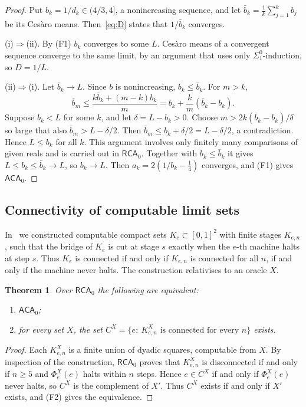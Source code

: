 \documentclass[11pt]{article}
\newtheorem{theorem}{Theorem}
\theoremstyle{definition}\newtheorem{definition}{Definition}[section]
\theoremstyle{remark}\newtheorem*{remark}{Remark}
\newcommand{\RCA}{\mathsf{RCA}_0}
\newcommand{\ACA}{\mathsf{ACA}_0}
\begin{document}
\begin{proof}
Put $b_k=1/d_k\in(4/3,4]$, a nonincreasing sequence, and let $\bar b_k=\tfrac1k\sum_{j=1}^kb_j$ be its Ces\`aro means. Then~\eqref{eq:D}
states that $1/\bar b_k$ converges.

(i)$\Rightarrow$(ii). By (F1) $b_k$ converges to some $L$. Ces\`aro means of a convergent sequence converge to the same limit,
by an argument that uses only $\Sigma^0_1$-induction, so $D=1/L$.

(ii)$\Rightarrow$(i). Let $\bar b_k\to L$. Since $b$ is nonincreasing, $b_k\le\bar b_k$. For $m>k$,
\begin{equation*}
\bar b_m\le\frac{k\bar b_k+(m-k)b_k}{m}=b_k+\frac km(\bar b_k-b_k).
\end{equation*}
Suppose $b_k<L$ for some $k$, and let $\delta=L-b_k>0$. Choose $m>2k(\bar b_k-b_k)/\delta$ so large that also $\bar b_m>L-\delta/2$. Then
$\bar b_m\le b_k+\delta/2=L-\delta/2$, a contradiction. Hence $L\le b_k$ for all $k$. This argument involves only finitely many
comparisons of given reals and is carried out in $\RCA$. Together with $b_k\le\bar b_k$ it gives $L\le b_k\le\bar b_k\to L$, so $b_k\to L$.
Then $a_k=2(1/b_k-\tfrac14)$ converges, and (F1) gives $\ACA$.
\end{proof}

\subsection{Connectivity of computable limit sets}

In~\cite{Chen2026_fcu} we constructed computable compact sets $K_e\subset[0,1]^2$ with finite stages $K_{e,n}$, such that the bridge
of $K_e$ is cut at stage $s$ exactly when the $e$-th machine halts at step $s$. Thus $K_e$ is connected if and only if
$K_{e,n}$ is connected for all $n$, if and only if the machine never halts. The construction relativises to an oracle $X$.

\begin{theorem}
\label{thm:connect}
Over $\RCA$ the following are equivalent:
\begin{enumerate}
\item[(i)] $\ACA$;
\item[(ii)] for every set $X$, the set $C^X=\{e:\ K^X_{e,n}\text{ is connected for every }n\}$ exists.
\end{enumerate}
\end{theorem}

\begin{proof}
Each $K^X_{e,n}$ is a finite union of dyadic squares, computable from $X$. By inspection of the construction, $\RCA$ proves
that $K^X_{e,n}$ is disconnected if and only if $n\ge5$ and $\Phi^X_e(e)$ halts within $n$ steps. Hence $e\in C^X$ if and only if $\Phi^X_e(e)$
never halts, so $C^X$ is the complement of $X'$. Thus $C^X$ exists if and only if $X'$ exists, and (F2) gives the equivalence.
\end{proof}
\end{document}
